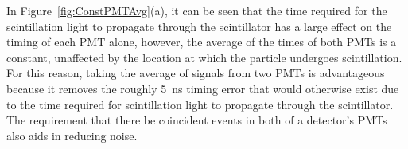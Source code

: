 In Figure~\ref{fig:ConstPMTAvg}(a), it can be seen that the time required for the scintillation light to propagate through the scintillator has a large effect on the timing of each PMT alone, however, the average of the times of both PMTs is a constant, unaffected by the location at which the particle undergoes scintillation.
For this reason, taking the average of signals from two PMTs is advantageous because it removes the roughly 5~ns timing error that would otherwise exist due to the time required for scintillation light to propagate through the scintillator.
The requirement that there be coincident events in both of a detector's PMTs also aids in reducing noise.
\begin{figure}[h]
\centering
{}


\end{figure}
